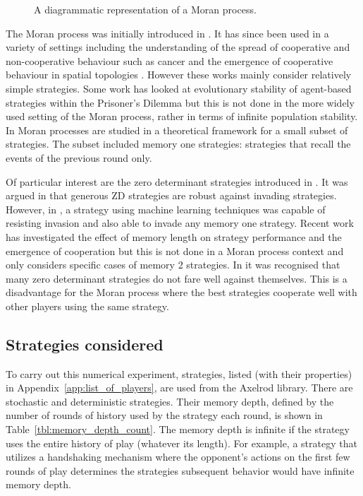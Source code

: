 \documentclass{article}
\begin{document}
\begin{figure}[!hbtp]
    \centering
    
    \caption{A diagrammatic representation of a Moran process.}
    \label{fig:moran_process}
\end{figure}

The Moran process was initially introduced in \cite{Moran1957}. It has since
been used in a variety of settings including the understanding of the spread of
cooperative and non-cooperative behaviour such as cancer \cite{West2016} and the
emergence of cooperative behaviour in spatial topologies \cite{Nowak2017}.
However these works mainly consider relatively simple strategies. Some work has
looked at evolutionary stability of agent-based strategies within the Prisoner's Dilemma
\cite{Li2014} but this is not done in the more widely used setting of the Moran
process, rather in terms of infinite population stability. In \cite{Baek2016}
Moran processes are studied in a theoretical framework for a small subset of
strategies. The subset included memory one strategies: strategies that recall
the events of the previous round only.

Of particular interest are the zero determinant strategies introduced in
\cite{Press2012}. It was argued in \cite{stewart2013extortion} that generous
ZD strategies are robust against invading strategies. However, in \cite{Lee2015},
a strategy using machine learning techniques was capable of resisting invasion
and also able to invade any memory one strategy. Recent work \cite{Hilbe2017}
has investigated the effect of memory length on strategy performance and the
emergence of cooperation but this is not done in a Moran process context and only
considers specific cases of memory 2 strategies. In \cite{Adami2013} it was
recognised that many zero determinant strategies do not fare well against
themselves. This is a disadvantage for the Moran process where the best
strategies cooperate well with other players using the same strategy.

\subsection{Strategies considered}\label{sec:strategies}

To carry out this numerical experiment, 
strategies, listed (with their properties) in Appendix~\ref{app:list_of_players},
are used from the Axelrod library. There are
stochastic and
deterministic strategies. Their memory depth,
defined by the number of rounds of history used by the strategy each round, is
shown in Table~\ref{tbl:memory_depth_count}. The memory depth is infinite if the
strategy uses the entire history of play (whatever its length). For example, a
strategy that utilizes a handshaking mechanism where the opponent's actions on
the first few rounds of play determines the strategies subsequent behavior would
have infinite memory depth.
\end{document}
